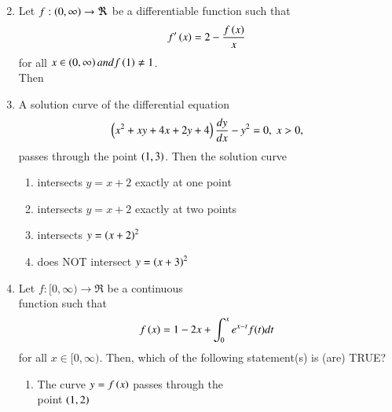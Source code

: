\documentclass[journal,12pt,onecolumn,article]{IEEEtran}
\theoremstyle{remark}
\begin{document}
\begin{enumerate}[start = 6]
\begin{enumerate}
\begin{multicols}{2}
\end{multicols}
\end{enumerate}
\item Let $f:\left(0,\infty\right) \rightarrow \Re$ be a differentiable function such that 
\begin{align*}
f^\prime\left(x\right) = 2-\frac{f\left(x\right)}{x}
\end{align*} for all $x \in \left(0,\infty\right) and f\left(1\right) \neq 1$. \\Then
\hfill{}
\begin{enumerate}
\end{enumerate}
\item A solution curve of the differential equation 
\begin{align*}
\left(x^2+xy+4x+2y+4\right)\frac{dy}{dx}-y^2=0,\;x>0,
\end{align*} passes through the point $\left(1,3\right)$. Then the solution curve
\hfill{}
\begin{enumerate}
\item intersects $y=x+2$ exactly at one point
\item intersects $y=x+2$ exactly at two points
\item intersects $y=\left(x+2\right)^2$ 
\item does NOT intersect $y=\left(x+3\right)^2$
\end{enumerate}
\item Let $f:[0,\infty)\rightarrow \Re$ be a continuous \\function such that
\begin{align*}
f\left(x\right) = 1-2x+ \int_0^x e^{x-t} f(t) dt
\end{align*} for all $x\in[0,\infty)$. Then, which of the following statement(s) is (are) TRUE?
\hfill{}
\begin{enumerate}
\item The curve $y=f\left(x\right)$ passes through the \\point $\left(1,2\right)$

\end{enumerate}
\end{enumerate}
\end{document}
